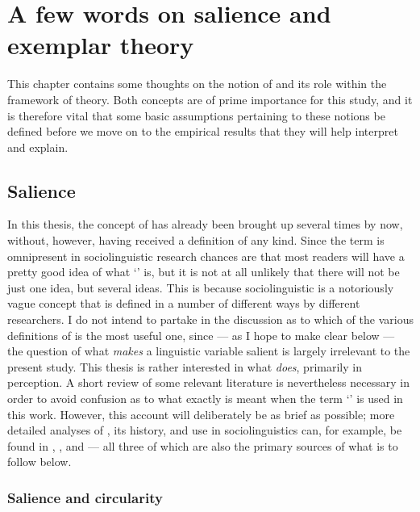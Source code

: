 \chapter{A few words on salience and exemplar theory}
\label{ch.sal}

This chapter contains some thoughts on the notion of  and its role within the framework of  theory.
Both concepts are of prime importance for this study, and it is therefore vital that some basic assumptions pertaining to these notions be defined before we move on to the empirical results that they will help interpret and explain.

	\section{Salience}
	\label{sec.sal.sal}

In this thesis, the concept of  has already been brought up several times by now, without, however, having received a definition of any kind.
Since the term is omnipresent in sociolinguistic research chances are that most readers will have a pretty good idea of what `' is, but it is not at all unlikely that there will not be just one idea, but several ideas.
This is because sociolinguistic  is a notoriously vague concept that is defined in a number of different ways by different researchers.
I do not intend to partake in the discussion as to which of the various definitions of  is the most useful one, since --- as I hope to make clear below --- the question of what \emph{makes} a linguistic variable salient is largely irrelevant to the present study.
This thesis is rather interested in what  \emph{does}, primarily in perception.
A short review of some relevant literature is nevertheless necessary in order to avoid confusion as to what exactly is meant when the term `' is used in this work.
However, this account will deliberately be as brief as possible; more detailed analyses of , its history, and use in sociolinguistics can, for example, be found in \cite{kerswillwilliams2002}, \cite{racz2013}, and \cite{auer2014} --- all three of which are also the primary sources of what is to follow below.

		\subsection{Salience and circularity}
		\label{sec.sal.sal.circle}

